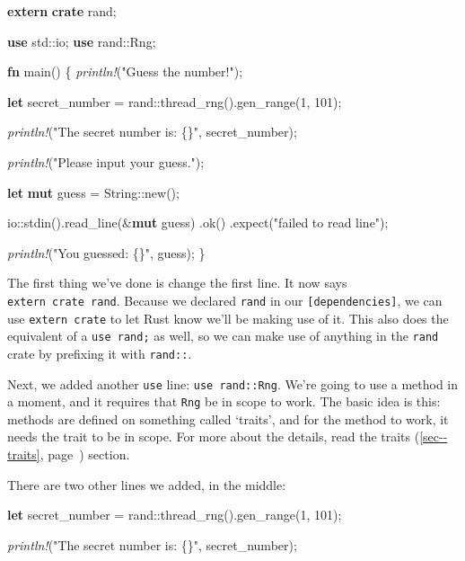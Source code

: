 \documentclass[a4paper,]{book}
\renewcommand*{\hyperref}[2][\ar]{%
  \def\ar{#2}%
  #2 (\autoref{#1}, page~\pageref{#1})}
\newenvironment{Shaded}{\begin{snugshade}}{\end{snugshade}}
\newcommand{\KeywordTok}[1]{\textcolor[rgb]{0.13,0.29,0.53}{\textbf{{#1}}}}
\newcommand{\DataTypeTok}[1]{\textcolor[rgb]{0.13,0.29,0.53}{{#1}}}
\newcommand{\DecValTok}[1]{\textcolor[rgb]{0.00,0.00,0.81}{{#1}}}
\newcommand{\StringTok}[1]{\textcolor[rgb]{0.31,0.60,0.02}{{#1}}}
\newcommand{\PreprocessorTok}[1]{\textcolor[rgb]{0.56,0.35,0.01}{\textit{{#1}}}}
\newcommand{\NormalTok}[1]{{#1}}
\begin{document}
\begin{Shaded}
\begin{Highlighting}[]
\KeywordTok{extern} \KeywordTok{crate} \NormalTok{rand;}

\KeywordTok{use} \NormalTok{std::io;}
\KeywordTok{use} \NormalTok{rand::Rng;}

\KeywordTok{fn} \NormalTok{main() \{}
    \PreprocessorTok{println!}\NormalTok{(}\StringTok{"Guess the number!"}\NormalTok{);}

    \KeywordTok{let} \NormalTok{secret_number = rand::thread_rng().gen_range(}\DecValTok{1}\NormalTok{, }\DecValTok{101}\NormalTok{);}

    \PreprocessorTok{println!}\NormalTok{(}\StringTok{"The secret number is: \{\}"}\NormalTok{, secret_number);}

    \PreprocessorTok{println!}\NormalTok{(}\StringTok{"Please input your guess."}\NormalTok{);}

    \KeywordTok{let} \KeywordTok{mut} \NormalTok{guess = }\DataTypeTok{String}\NormalTok{::new();}

    \NormalTok{io::stdin().read_line(&}\KeywordTok{mut} \NormalTok{guess)}
        \NormalTok{.ok()}
        \NormalTok{.expect(}\StringTok{"failed to read line"}\NormalTok{);}

    \PreprocessorTok{println!}\NormalTok{(}\StringTok{"You guessed: \{\}"}\NormalTok{, guess);}
\NormalTok{\}}
\end{Highlighting}
\end{Shaded}

The first thing we've done is change the first line. It now says
\texttt{extern\ crate\ rand}. Because we declared \texttt{rand} in our
\texttt{{[}dependencies{]}}, we can use \texttt{extern\ crate} to let
Rust know we'll be making use of it. This also does the equivalent of a
\texttt{use\ rand;} as well, so we can make use of anything in the
\texttt{rand} crate by prefixing it with \texttt{rand::}.

Next, we added another \texttt{use} line: \texttt{use\ rand::Rng}. We're
going to use a method in a moment, and it requires that \texttt{Rng} be
in scope to work. The basic idea is this: methods are defined on
something called `traits', and for the method to work, it needs the
trait to be in scope. For more about the details, read the
\hyperref[sec--traits]{traits} section.

There are two other lines we added, in the middle:

\begin{Shaded}
\begin{Highlighting}[]
    \KeywordTok{let} \NormalTok{secret_number = rand::thread_rng().gen_range(}\DecValTok{1}\NormalTok{, }\DecValTok{101}\NormalTok{);}

    \PreprocessorTok{println!}\NormalTok{(}\StringTok{"The secret number is: \{\}"}\NormalTok{, secret_number);}
\end{Highlighting}
\end{Shaded}
\end{document}

